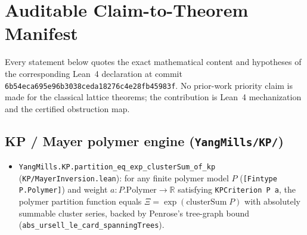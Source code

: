 \documentclass[11pt]{article}
\newcommand{\R}{\mathbb{R}}
\begin{document}
\section{Auditable Claim-to-Theorem Manifest}\label{sec:manifest}

Every statement below quotes the exact mathematical content and hypotheses of the
corresponding Lean~4 declaration at commit \texttt{6b54eca695e96b3038ceda18276c4e28fb45983f}.
No prior-work priority claim is made for the classical lattice theorems; the contribution
is Lean~4 mechanization and the certified obstruction map.

\subsection{KP / Mayer polymer engine (\texttt{YangMills/KP/})}
\begin{itemize}
  \item \nolinkurl{YangMills.KP.partition_eq_exp_clusterSum_of_kp}
  (\texttt{KP/MayerInversion.lean}): for any finite polymer model $P$
  (\texttt{[Fintype P.Polymer]}) and weight $a : P.\mathrm{Polymer} \to \R$ satisfying
  \texttt{KPCriterion P a}, the polymer partition function equals
  $\Xi = \exp(\mathrm{clusterSum}\;P)$ with absolutely summable cluster series, backed by
  Penrose's tree-graph bound (\texttt{abs\_ursell\_le\_card\_spanningTrees}).
\end{itemize}
\end{document}
